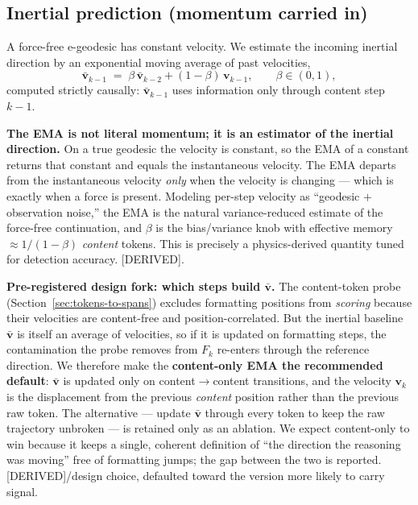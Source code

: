 \documentclass[11pt]{article}
\begin{document}
\subsection{Inertial prediction (momentum carried in)}
A force-free e-geodesic has constant velocity. We estimate the incoming inertial direction by an exponential moving average of past velocities,
\begin{equation}
  \bar{\bm{v}}_{k-1} \;=\; \beta\,\bar{\bm{v}}_{k-2} + (1-\beta)\,\bm{v}_{k-1},
  \qquad \beta \in (0,1),
  \label{eq:ema}
\end{equation}
computed strictly causally: $\bar{\bm{v}}_{k-1}$ uses information only through content step $k{-}1$.

\begin{honestbox}
\textbf{The EMA is not literal momentum; it is an estimator of the inertial direction.} On a true geodesic the velocity is constant, so the EMA of a constant returns that constant and equals the instantaneous velocity. The EMA departs from the instantaneous velocity \emph{only} when the velocity is changing --- which is exactly when a force is present. Modeling per-step velocity as ``geodesic $+$ observation noise,'' the EMA is the natural variance-reduced estimate of the force-free continuation, and $\beta$ is the bias/variance knob with effective memory $\approx 1/(1-\beta)$ \emph{content} tokens. This is precisely a physics-derived quantity tuned for detection accuracy. \textsf{[DERIVED]}.
\end{honestbox}

\begin{honestbox}
\textbf{Pre-registered design fork: which steps build $\bar{\bm{v}}$.} The content-token probe (Section~\ref{sec:tokens-to-spans}) excludes formatting positions from \emph{scoring} because their velocities are content-free and position-correlated. But the inertial baseline $\bar{\bm{v}}$ is itself an average of velocities, so if it is updated on formatting steps, the contamination the probe removes from $F_k$ re-enters through the reference direction. We therefore make the \textbf{content-only EMA the recommended default}: $\bar{\bm{v}}$ is updated only on content$\to$content transitions, and the velocity $\bm{v}_k$ is the displacement from the previous \emph{content} position rather than the previous raw token. The alternative --- update $\bar{\bm{v}}$ through every token to keep the raw trajectory unbroken --- is retained only as an ablation. We expect content-only to win because it keeps a single, coherent definition of ``the direction the reasoning was moving'' free of formatting jumps; the gap between the two is reported. \textsf{[DERIVED]}/design choice, defaulted toward the version more likely to carry signal.
\end{honestbox}
\end{document}
